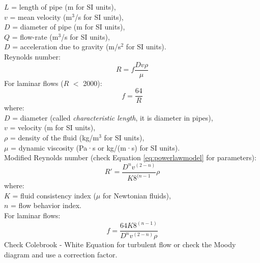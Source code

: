 \documentclass[a4paper, landscape, 8pt]{extarticle}
\begin{document}
\begin{multicols}{4}
$L$ = length of pipe (m for SI units),\\
$v$ = mean velocity (m$^3$/s for SI units),\\
$D$ = diameter of pipe (m for SI units),\\
$Q$ = flow-rate (m$^3$/s for SI units),\\
$D$ = acceleration due to gravity (m/s$^2$ for SI units).\\
Reynolds number:
\[
R = f\frac{Dv\rho}{\mu}
\]
For laminar flows ($R$ $<$ 2000):
\[
f = \frac{64}{R}
\]
where:\\
$D$ = diameter (called \textit{characteristic length}, it is diameter in pipes),\\
$v$ = velocity (m for SI units),\\
$\rho$ = density of the fluid (kg/m$^3$ for SI units),\\
$\mu$ = dynamic viscosity (Pa·s or kg/(m·s) for SI units).\\
Modified Reynolds number (check Equation \ref{eq:powerlawmodel} for parameters):
\[
R' = \frac{D^nv^{(2-n)}}{K8^{(n-1}}\rho
\]
where:\\
$K$ = fluid consistency index ($\mu$ for Newtonian fluids),\\
$n$ = flow behavior index.\\
For laminar flows:
\[
f = \frac{64K8^{(n-1)}}{D^nv^{(2-n)}\rho}
\]
Check Colebrook - White Equation for turbulent flow or check the Moody diagram and use a correction factor.

\end{multicols}
\end{document}

